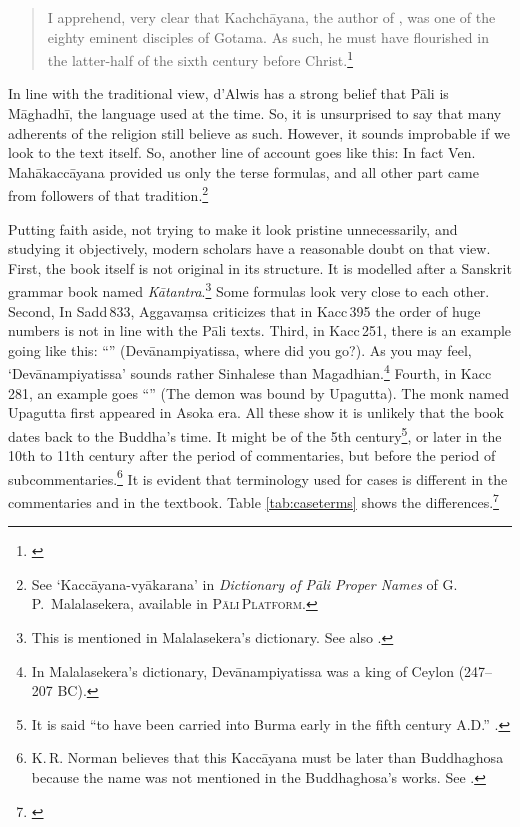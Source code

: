 \begin{quote}
I apprehend, very clear that Kachch\=ayana, the author of , was one of the eighty eminent disciples of Gotama. As such, he must have flourished in the latter-half of the sixth century before Christ.\footnote{\citealp[p.~xxx]{dalwis:kach}}
\end{quote}

In line with the traditional view, d'Alwis has a strong belief that P\=ali is M\=aghadh\=i, the language used at the time. So, it is unsurprised to say that many adherents of the religion still believe as such. However, it sounds improbable if we look to the text itself. So, another line of account goes like this: In fact Ven.\,Mah\=akacc\=ayana provided us only the terse formulas, and all other part came from followers of that tradition.\footnote{See `Kacc\=ayana-vy\=akarana' in \emph{Dictionary of P\=ali Proper Names} of G.\,P.\ Malalasekera, available in \textsc{P\=ali\,Platform}.}

Putting faith aside, not trying to make it look pristine unnecessarily, and studying it objectively, modern scholars have a reasonable doubt on that view. First, the book itself is not original in its structure. It is modelled after a Sanskrit grammar book named \emph{K\=atantra}.\footnote{This is mentioned in Malalasekera's dictionary. See also \citealp[p.~163]{norman:literature}.} Some formulas look very close to each other. Second, In Sadd\,833, Aggava\d msa criticizes that in Kacc\,395 the order of huge numbers is not in line with the P\=ali texts. Third, in Kacc\,251, there is an example going like this: ``'' (Dev\=anampiyatissa, where did you go?). As you may feel, `Dev\=anampiyatissa' sounds rather Sinhalese than Magadhian.\footnote{In Malalasekera's dictionary, Dev\=anampiyatissa was a king of Ceylon (247--207 BC).} Fourth, in Kacc\,281, an example goes ``'' (The demon was bound by Upagutta). The monk named Upagutta first appeared in Asoka era. All these show it is unlikely that the book dates back to the Buddha's time. It might be of the 5th century\footnote{It is said ``to have been carried into Burma early in the fifth century A.D.'' \citep[p.~622]{law:history}.}, or later in the 10th to 11th century after the period of commentaries, but before the period of subcommentaries.\footnote{K.\,R. Norman believes that this Kacc\=ayana must be later than Buddhaghosa because the name was not mentioned in the Buddhaghosa's works. See \citealp[p.~163]{norman:literature}.} It is evident that terminology used for cases is different in the commentaries and in the textbook. Table \ref{tab:caseterms} shows the differences.\footnote{\citealp[p.~10]{supaphan:pali}}

